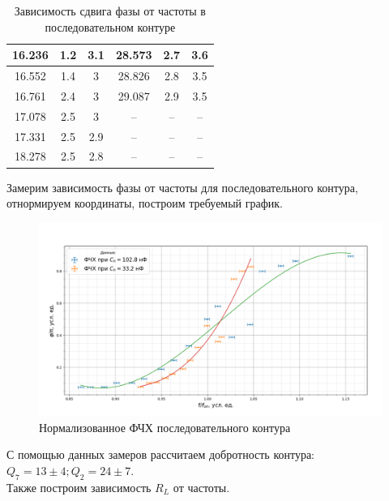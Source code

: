 \documentclass[a4paper, 12pt]{article}%
\begin{document}
\begin{table}[H]
\begin{tabular}{|ccc|ccc|}
			\multicolumn{1}{|c|}{16.236} & \multicolumn{1}{c|}{1.2} & 3.1 & \multicolumn{1}{c|}{28.573} & \multicolumn{1}{c|}{2.7} & 3.6 \\ \hline
			\multicolumn{1}{|c|}{16.552} & \multicolumn{1}{c|}{1.4} & 3   & \multicolumn{1}{c|}{28.826} & \multicolumn{1}{c|}{2.8} & 3.5 \\ \hline
			\multicolumn{1}{|c|}{16.761} & \multicolumn{1}{c|}{2.4} & 3   & \multicolumn{1}{c|}{29.087} & \multicolumn{1}{c|}{2.9} & 3.5 \\ \hline
			\multicolumn{1}{|c|}{17.078} & \multicolumn{1}{c|}{2.5} & 3   & \multicolumn{1}{c|}{--}       & \multicolumn{1}{c|}{--}    &   --  \\ \hline
			\multicolumn{1}{|c|}{17.331} & \multicolumn{1}{c|}{2.5} & 2.9 & \multicolumn{1}{c|}{--}       & \multicolumn{1}{c|}{--}    &  --   \\ \hline
			\multicolumn{1}{|c|}{18.278} & \multicolumn{1}{c|}{2.5} & 2.8 & \multicolumn{1}{c|}{--}       & \multicolumn{1}{c|}{--}    &  --   \\ \hline
		\end{tabular}
	\caption{Зависимость сдвига фазы от частоты в последовательном контуре}
	\end{table}
	Замерим зависимость фазы от частоты для последовательного контура, отнормируем координаты, построим требуемый график.\\
	\begin{figure}[H]
		\centering
		\includegraphics[width=0.92\linewidth]{фчх}
		\caption{Нормализованное ФЧХ последовательного контура}
		\label{fig:}
	\end{figure}
	С помощью данных замеров рассчитаем добротность контура: $Q_7=13 \pm 4; Q_2 = 24 \pm 7$.\\
	Также построим зависимость $R_L$ от частоты.\\
\end{document}
